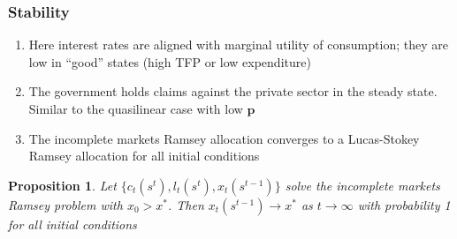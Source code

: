 \documentclass{beamer}
\newcommand{\EE}{\mathbb E}
\newtheorem{proposition}{Proposition}
\begin{document}
%
%
%
\begin{frame}
	\frametitle{Stability}
	\begin{enumerate}
	 \item Here interest rates are aligned with marginal utility of consumption;  they are low  in ``good'' states (high TFP or low expenditure)
	 \item The government holds claims against the private sector in the steady state. Similar to the quasilinear case with  low  $\bm{p}$	
	 \item The incomplete markets Ramsey allocation converges to a Lucas-Stokey  Ramsey allocation for all initial conditions	 	
	\end{enumerate}


	\begin{proposition}  Let $\{c_t(s^t), l_t(s^t), x_t(s^{t-1})\}$ solve the incomplete markets Ramsey problem with $x_0 > x^*$.  Then  $x_t(s^{t-1})\rightarrow x^*$ as $t\rightarrow \infty$ with probability 1 for all initial conditions
	
	\end{proposition}
	\end{frame}
	
\end{document}
